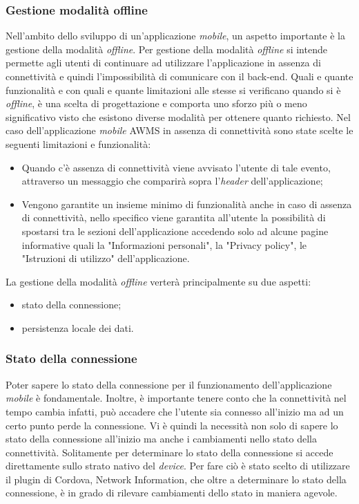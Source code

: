 \subsubsection{Gestione modalità offline}	
Nell'ambito dello sviluppo di un'applicazione \emph{mobile}, un aspetto importante è la gestione della modalità \emph{offline}. Per gestione della modalità \emph{offline} si intende permette agli utenti di continuare ad utilizzare l'applicazione in assenza di connettività e quindi l'impossibilità di comunicare con il back-end. Quali e quante funzionalità e con quali e quante limitazioni alle stesse si verificano quando si è \emph{offline}, è una scelta di progettazione e comporta uno sforzo più o meno significativo visto che esistono diverse modalità per ottenere quanto richiesto. Nel caso dell'applicazione \emph{mobile} \gls{AWMS} in assenza di connettività sono state scelte le seguenti limitazioni e funzionalità:
\begin{itemize}
	\item Quando c'è assenza di connettività viene avvisato l'utente di tale evento, attraverso un messaggio che comparirà sopra l'\emph{header} dell'applicazione;
	\item Vengono garantite un insieme minimo di funzionalità anche in caso di assenza di connettività, nello specifico viene garantita all'utente la possibilità di spostarsi tra le sezioni dell'applicazione accedendo solo ad alcune pagine informative quali la "Informazioni personali", la "Privacy policy", le "Istruzioni di utilizzo" dell'applicazione.
\end{itemize}

La gestione della modalità \emph{offline} verterà principalmente su due aspetti:
\begin{itemize}
	\item stato della connessione;
	\item persistenza locale dei dati.
\end{itemize}
\subsubsection{Stato della connessione}
Poter sapere lo stato della connessione per il funzionamento dell'applicazione \emph{mobile} è fondamentale. Inoltre, è importante tenere conto che la connettività nel tempo cambia infatti, può accadere che l'utente sia connesso all'inizio ma ad un certo punto perde la connessione. Vi è quindi la necessità non solo di sapere lo stato della connessione all'inizio ma anche i cambiamenti nello stato della connettività. Solitamente per determinare lo stato della connessione si accede direttamente sullo strato nativo del \emph{device}. Per fare ciò è stato scelto di utilizzare il plugin di Cordova, Network Information, che oltre a determinare lo stato della connessione, è in grado di rilevare cambiamenti dello stato in maniera agevole.


